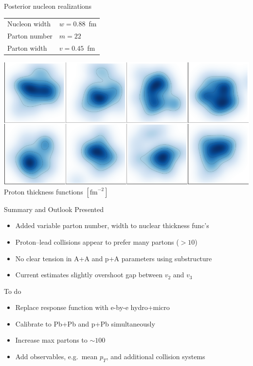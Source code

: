 \documentclass[aspectratio=43]{beamer}
\theoremstyle{definition}
\begin{document}
\begin{frame}[plain]{Posterior nucleon realizations}
  \smallskip
  \begin{tabular}{ll}
    Nucleon width & $w = 0.88$~fm \\
    Parton number & $m = 22$ \\
    Parton width & $v = 0.45$~fm \\[1ex]
  \end{tabular}
  \includegraphics[width=\textwidth]{posterior_protons} \\[1ex]
  \centering
  \small Proton thickness functions $[\mathrm{fm}^{-2}]$
\end{frame}

\begin{frame}{Summary and Outlook}
  \large Presented \\
  \begin{itemize}
    \small
    \item Added variable parton number, width to nuclear thickness func's
    \item Proton--lead collisions appear to prefer many partons (${>}10$)
    \item No clear tension in A+A and p+A parameters using substructure
    \item Current estimates slightly overshoot gap between $v_2$ and $v_3$
  \end{itemize}
  \large To do \\
  \begin{itemize}
    \small
    \item Replace response function with e-by-e hydro+micro
    \item Calibrate to Pb+Pb and p+Pb simultaneously
    \item Increase max partons to $\sim\!100$
    \item Add observables, e.g.\ mean $p_T$, and additional collision systems
  \end{itemize}

\end{frame}
\end{document}
